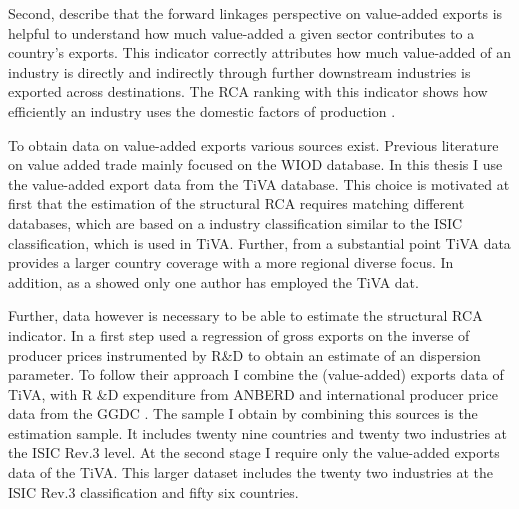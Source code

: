  Second, \textcite{wang2013} describe that  the forward linkages perspective on value-added exports is helpful to understand how much value-added a given sector contributes to a country's exports.  This indicator correctly attributes how much value-added of an industry is directly  and indirectly through further downstream industries is exported across destinations.  The RCA ranking with this indicator shows how efficiently an industry uses the domestic factors of production  \textcite{bladwin}. %
\par %
To obtain data on value-added exports various sources exist. Previous literature on value added trade mainly focused on the WIOD \textcite{Timmer2012} database. In this thesis I use the value-added export data from the TiVA \textcite{tiva2} database. This choice is motivated at first that the estimation of the structural RCA requires matching different databases, which are based on a industry classification similar to the ISIC classification, which is used in TiVA. Further, from a substantial point TiVA data provides a larger country coverage with a more regional diverse focus. In addition, as a \textcite{johnson} showed only one author has employed the TiVA dat. \par
Further, data however is necessary to be able to estimate the structural RCA indicator. In a first step \textcite{costinot}  used a regression of gross exports on the inverse of producer prices instrumented by R\&D to obtain an estimate of an dispersion parameter. To follow their approach I combine  the (value-added) exports data of \textcite{tiva2} TiVA, with  R \&D expenditure from \textcite{stan2} ANBERD and  international producer price data from the GGDC  \parencite{Inklaar2012}. The sample I obtain by combining this sources is the estimation sample. It includes twenty nine countries and twenty two industries at the ISIC Rev.3 level. At the second stage I require only the value-added exports data of the TiVA. This larger dataset includes the twenty two industries at the ISIC Rev.3 classification and fifty six countries.
